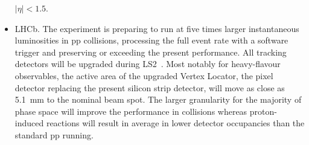 \begin{itemize}
$|\eta|<1.5$. 
\item  LHCb. The experiment is preparing to run at five times larger instantaneous luminosities in pp collisions, processing the full event rate with a software trigger and preserving or exceeding the present performance.
All tracking detectors will be upgraded during LS2~\cite{Collaboration:1624070,Collaboration:1647400}. 
Most notably for heavy-flavour observables, the active area of the upgraded Vertex Locator, the pixel detector replacing the present silicon strip detector, will move as close as 5.1~mm to the nominal beam spot.
The larger granularity for the majority of phase space will improve the performance in \PbPb collisions whereas proton-induced reactions will result in average in lower detector occupancies than the standard pp running.  
\end{itemize}

